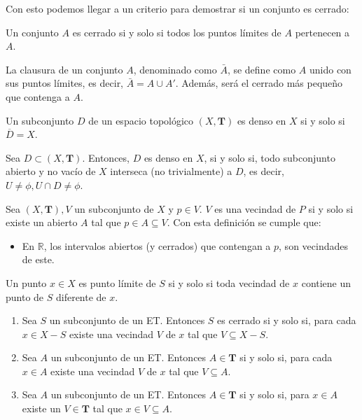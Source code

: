\documentclass{../Topologia.tex}
\begin{document}
Con esto podemos llegar a un criterio para demostrar si un conjunto es cerrado:

\begin{defin}
Un conjunto $A$ es cerrado si y solo si todos los puntos límites de $A$ pertenecen a $A$.
\end{defin}

\begin{defin}
La clausura de un conjunto $A$, denominado como $\bar{A}$, se define como $A$ unido con sus puntos límites, es decir, $\bar{A}=A\cup A'$. Además, será el cerrado más pequeño que contenga a $A$.
\end{defin}

\begin{defin}
Un subconjunto $D$ de un espacio topológico $(X,\mathbf{T})$ es denso en $X$ si y solo si $\overline{D}=X$.
\end{defin}

\begin{prop}
Sea $D\subset(X,\mathbf{T})$. Entonces, $D$ es denso en $X$, si y solo si, todo subconjunto abierto y no vacío de $X$ interseca (no trivialmente) a $D$, es decir, $U \neq \phi, U \cap D \neq \phi$.
\end{prop}

\begin{defin}
Sea $(X,\mathbf{T}), V$ un subconjunto de $X$ y $p \in V$. $V$ es una vecindad de $P$ si y solo si existe un abierto $A$ tal que $p \in A \subseteq V$. Con esta definición se cumple que:
\begin{itemize}
    \item En $\mathbb{R}$, los intervalos abiertos (y cerrados) que contengan a $p$, son vecindades de este.
\end{itemize}
\end{defin}

\begin{prop}
Un punto $x \in X$ es punto límite de $S$ si y solo si toda vecindad de $x$ contiene un punto de $S$ diferente de $x$.
\end{prop}

\begin{teorema}
\begin{enumerate}
    \item Sea $S$ un subconjunto de un ET. Entonces $S$ es cerrado si y solo si, para cada $x \in X-S$ existe una vecindad $V$ de $x$ tal que $V \subseteq X - S$.
    \item Sea $A$ un subconjunto de un ET. Entonces $A\in \mathbf{T}$ si y solo si, para cada $x \in A$ existe una vecindad $V$ de $x$ tal que $V\subseteq A$.
    \item Sea $A$ un subconjunto de un ET. Entonces $A \in \mathbf{T}$ si y solo si, para $x \in A$ existe un $V \in \mathbf{T}$ tal que $x \in V \subseteq A$.
\end{enumerate}
\end{teorema}
\end{document}
